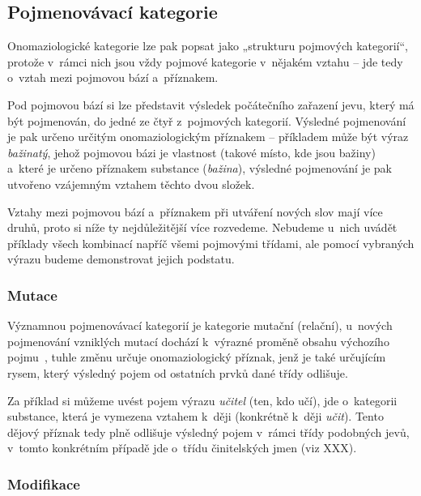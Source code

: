 \hypertarget{pojmenovuxe1vacuxed-kategorie}{%
\subsection{Pojmenovávací
kategorie}\label{pojmenovuxe1vacuxed-kategorie}}

Onomaziologické kategorie lze pak popsat jako „strukturu pojmových
kategorií``, protože v~rámci nich jsou vždy pojmové kategorie v~nějakém
vztahu -- jde tedy o~vztah mezi pojmovou bází a~příznakem.
\parencite{enc-onomaz-kateg17}

Pod pojmovou bází si lze představit výsledek počátečního zařazení jevu,
který má být pojmenován, do jedné ze čtyř z~pojmových kategorií.
Výsledné pojmenování je pak určeno určitým onomaziologickým příznakem --
příkladem může být výraz \emph{bažinatý}, jehož pojmovou bázi je
vlastnost (takové místo, kde jsou bažiny) a~které je určeno příznakem
substance (\emph{bažina}), výsledné pojmenování je pak utvořeno
vzájemným vztahem těchto dvou složek.~\parencite[29]{dokulil62}

Vztahy mezi pojmovou bází a~příznakem při utváření nových slov mají více
druhů, proto si níže ty nejdůležitější více rozvedeme. Nebudeme u~nich
uvádět příklady všech kombinací napříč všemi pojmovými třídami, ale
pomocí vybraných výrazu budeme demonstrovat jejich podstatu.

\hypertarget{mutace}{%
\subsubsection{Mutace}\label{mutace}}

Významnou pojmenovávací kategorií je kategorie mutační (relační),
u~nových pojmenování vzniklých mutací dochází k~výrazné proměně obsahu
výchozího pojmu~\parencite[102]{dokulil00}, tuhle změnu určuje
onomaziologický příznak, jenž je také určujícím rysem, který výsledný
pojem od ostatních prvků dané třídy odlišuje.~\parencite{enc-mutace17}

Za příklad si můžeme uvést pojem výrazu \emph{učitel} (ten, kdo učí),
jde o~kategorii substance, která je vymezena vztahem k~ději (konkrétně
k~ději \emph{učit}). Tento dějový příznak tedy plně odlišuje výsledný
pojem v~rámci třídy podobných jevů, v~tomto konkrétním případě jde
o~třídu činitelských jmen (viz XXX).

\hypertarget{modifikace}{%
\subsubsection{Modifikace}\label{modifikace}}

